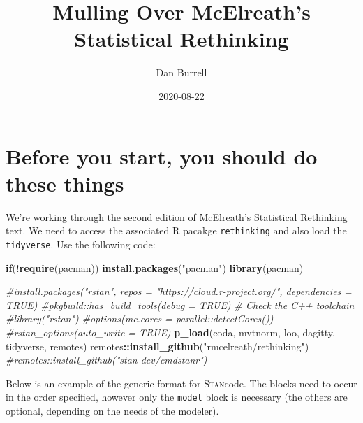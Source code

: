 \documentclass[
]{book}
\title{Mulling Over McElreath's Statistical Rethinking}
\author{Dan Burrell}
\date{2020-08-22}
\newenvironment{Shaded}{\begin{snugshade}}{\end{snugshade}}
\newcommand{\CommentTok}[1]{\textcolor[rgb]{0.56,0.35,0.01}{\textit{#1}}}
\newcommand{\ControlFlowTok}[1]{\textcolor[rgb]{0.13,0.29,0.53}{\textbf{#1}}}
\newcommand{\KeywordTok}[1]{\textcolor[rgb]{0.13,0.29,0.53}{\textbf{#1}}}
\newcommand{\NormalTok}[1]{#1}
\newcommand{\OperatorTok}[1]{\textcolor[rgb]{0.81,0.36,0.00}{\textbf{#1}}}
\newcommand{\StringTok}[1]{\textcolor[rgb]{0.31,0.60,0.02}{#1}}
\newcommand{\stan}{\textsc{Stan}}
\begin{document}
\maketitle

{
\setcounter{tocdepth}{1}
\tableofcontents
}
\hypertarget{before-you-start-you-should-do-these-things}{%
\chapter{Before you start, you should do these things}\label{before-you-start-you-should-do-these-things}}

We're working through the second edition of McElreath's Statistical Rethinking text. We need to access the associated R pacakge \texttt{rethinking} and also load the \texttt{tidyverse}. Use the following code:

\begin{Shaded}
\begin{Highlighting}[]
\ControlFlowTok{if}\NormalTok{(}\OperatorTok{!}\KeywordTok{require}\NormalTok{(pacman)) }\KeywordTok{install.packages}\NormalTok{(}\StringTok{"pacman"}\NormalTok{)}
\KeywordTok{library}\NormalTok{(pacman)}

\CommentTok{#install.packages("rstan", repos = "https://cloud.r-project.org/", dependencies = TRUE)}
\CommentTok{#pkgbuild::has_build_tools(debug = TRUE) # Check the C++ toolchain}
\CommentTok{#library("rstan")}
\CommentTok{#options(mc.cores = parallel::detectCores())}
\CommentTok{#rstan_options(auto_write = TRUE)}
\KeywordTok{p_load}\NormalTok{(coda, mvtnorm, loo, dagitty, tidyverse, remotes)}
\NormalTok{remotes}\OperatorTok{::}\KeywordTok{install_github}\NormalTok{(}\StringTok{"rmcelreath/rethinking"}\NormalTok{)}
\CommentTok{#remotes::install_github("stan-dev/cmdstanr")}
\end{Highlighting}
\end{Shaded}

Below is an example of the generic format for \stan code. The blocks need to occur in the order specified, however only the \texttt{model} block is necessary (the others are optional, depending on the needs of the modeler).
\end{document}
